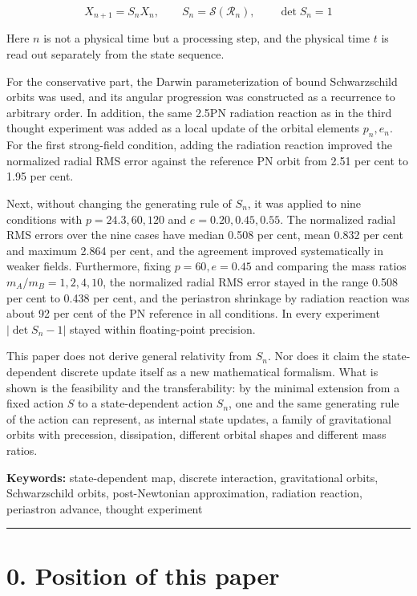 \documentclass[
  a4paper,
]{article}
\begin{document}
\[
X_{n+1}=S_nX_n,
\qquad
S_n=\mathcal S(\mathcal R_n),
\qquad
\det S_n=1
\]

Here \(n\) is not a physical time but a processing step, and the
physical time \(t\) is read out separately from the state sequence.

For the conservative part, the Darwin parameterization of bound
Schwarzschild orbits was used, and its angular progression was
constructed as a recurrence to arbitrary order. In addition, the same
2.5PN radiation reaction as in the third thought experiment was added as
a local update of the orbital elements \(p_n,e_n\). For the first
strong-field condition, adding the radiation reaction improved the
normalized radial RMS error against the reference PN orbit from 2.51 per
cent to 1.95 per cent.

Next, without changing the generating rule of \(S_n\), it was applied to
nine conditions with \(p=24.3,60,120\) and \(e=0.20,0.45,0.55\). The
normalized radial RMS errors over the nine cases have median 0.508 per
cent, mean 0.832 per cent and maximum 2.864 per cent, and the agreement
improved systematically in weaker fields. Furthermore, fixing
\(p=60,e=0.45\) and comparing the mass ratios \(m_A/m_B=1,2,4,10\), the
normalized radial RMS error stayed in the range 0.508 per cent to 0.438
per cent, and the periastron shrinkage by radiation reaction was about
92 per cent of the PN reference in all conditions. In every experiment
\(|\det S_n-1|\) stayed within floating-point precision.

This paper does not derive general relativity from \(S_n\). Nor does it
claim the state-dependent discrete update itself as a new mathematical
formalism. What is shown is the feasibility and the transferability: by
the minimal extension from a fixed action \(S\) to a state-dependent
action \(S_n\), one and the same generating rule of the action can
represent, as internal state updates, a family of gravitational orbits
with precession, dissipation, different orbital shapes and different
mass ratios.

\textbf{Keywords:} state-dependent map, discrete interaction,
gravitational orbits, Schwarzschild orbits, post-Newtonian
approximation, radiation reaction, periastron advance, thought
experiment

\begin{center}\rule{0.5\linewidth}{0.5pt}\end{center}

\section{0. Position of this paper}\label{position-of-this-paper}
\end{document}
